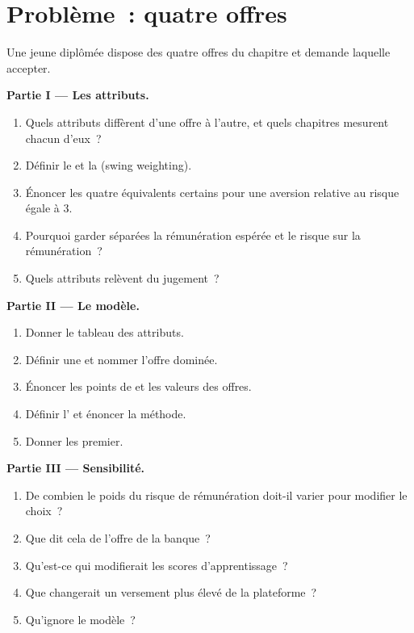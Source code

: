 \section{Problème~: quatre offres}

\begin{problem}\label{pb:in:choosing:1}
Une jeune diplômée dispose des quatre offres du chapitre et demande laquelle accepter.

\medskip\noindent\textbf{Partie I --- Les attributs.}
\begin{enumerate}
\item Quels attributs diffèrent d'une offre à l'autre, et quels chapitres mesurent chacun d'eux~?
\item Définir le  et la  (swing weighting).
\item Énoncer les quatre équivalents certains pour une aversion relative au risque égale à 3.
\item Pourquoi garder séparées la rémunération espérée et le risque sur la rémunération~?
\item Quels attributs relèvent du jugement~?
\end{enumerate}

\medskip\noindent\textbf{Partie II --- Le modèle.}
\begin{enumerate}[resume]
\item Donner le tableau des attributs.
\item Définir une  et nommer l'offre dominée.
\item Énoncer les points de  et les valeurs des offres.
\item Définir l' et énoncer la méthode.
\item Donner les  premier.
\end{enumerate}

\medskip\noindent\textbf{Partie III --- Sensibilité.}
\begin{enumerate}[resume]
\item De combien le poids du risque de rémunération doit-il varier pour modifier le choix~?
\item Que dit cela de l'offre de la banque~?
\item Qu'est-ce qui modifierait les scores d'apprentissage~?
\item Que changerait un versement plus élevé de la plateforme~?
\item Qu'ignore le modèle~?
\end{enumerate}


\end{problem}
